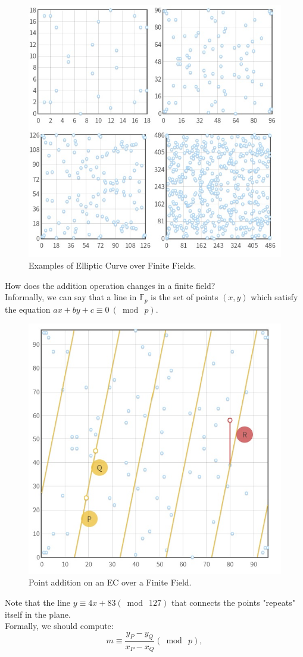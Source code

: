 \begin{figure}[H]
	\centering
	\includegraphics[width=.7\linewidth]{EC_ex.jpg}
	\caption{Examples of Elliptic Curve over Finite Fields\cite{graf}.}
\end{figure}
How does the addition operation changes in a finite field?\\
Informally, we can say that a line in $\mathbb{F}_{p}$ is the set of points $(x,y)$ which satisfy the equation $ax+by+c\equiv 0\ (\bmod\ p)$.
\begin{figure}[H]
	\centering
	\includegraphics[width=.7\linewidth]{EC_aligned.jpg}
	\caption{Point addition on an EC over a Finite Field\cite{graf}.}
	\label{img:ec-ff}
\end{figure}
Note that the line $y\equiv 4x+83 (\bmod\ 127)$ that connects the points "repeats" itself in the plane.\\
Formally, we should compute:
\begin{equation}
m\equiv \frac{y_{P}-y_{Q}}{x_{P}-x_{Q}} (\bmod\ p),
\end{equation}

